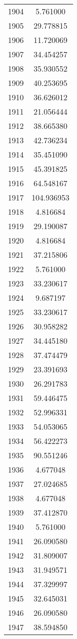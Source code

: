 \documentclass[12pt]{article}
\begin{document}
\begin{longtable}{@{}cc@{}}
1904 & 5.761000 \\
1905 & 29.778815 \\
1906 & 11.720069 \\
1907 & 34.454257 \\
1908 & 35.930552 \\
1909 & 40.253695 \\
1910 & 36.626012 \\
1911 & 21.056444 \\
1912 & 38.665380 \\
1913 & 42.736234 \\
1914 & 35.451090 \\
1915 & 45.391825 \\
1916 & 64.548167 \\
1917 & 104.936953 \\
1918 & 4.816684 \\
1919 & 29.190087 \\
1920 & 4.816684 \\
1921 & 37.215806 \\
1922 & 5.761000 \\
1923 & 33.230617 \\
1924 & 9.687197 \\
1925 & 33.230617 \\
1926 & 30.958282 \\
1927 & 34.445180 \\
1928 & 37.474479 \\
1929 & 23.391693 \\
1930 & 26.291783 \\
1931 & 59.446475 \\
1932 & 52.996331 \\
1933 & 54.053065 \\
1934 & 56.422273 \\
1935 & 90.551246 \\
1936 & 4.677048 \\
1937 & 27.024685 \\
1938 & 4.677048 \\
1939 & 37.412870 \\
1940 & 5.761000 \\
1941 & 26.090580 \\
1942 & 31.809007 \\
1943 & 31.949571 \\
1944 & 37.329997 \\
1945 & 32.645031 \\
1946 & 26.090580 \\
1947 & 38.594850 \\

\end{longtable}
\end{document}
